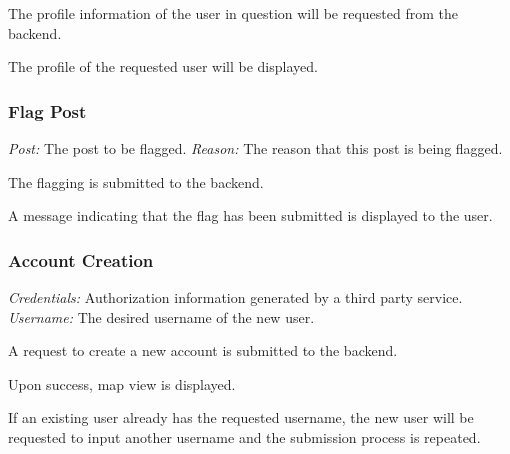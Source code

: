                The profile information of the user in question will be requested from
                the backend.

                The profile of the requested user will be displayed.

                

        \subsubsection{Flag Post}
                \textit{Post:} The post to be flagged. \newline
                \textit{Reason:} The reason that this post is being flagged.

                The flagging is submitted to the backend. 

                A message indicating that the flag has been submitted is displayed
                to the user.

                

        \subsubsection{Account Creation}
                \textit{Credentials:} Authorization information generated by a third
                                        party service. \newline
                \textit{Username:} The desired username of the new user.

                A request to create a new account is submitted to the backend.

                Upon success, map view is displayed.

                If an existing user already has the requested username, the new user
                will be requested to input another username and the submission process
                is repeated. \newline
                

